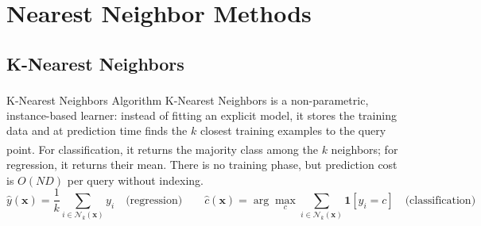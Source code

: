 \section{Nearest Neighbor Methods}

\subsection{K-Nearest Neighbors}

\begin{v3topic}{K-Nearest Neighbors Algorithm}
    K-Nearest Neighbors\textsuperscript{\cite{coverNearestNeighborPattern1967}} is a non-parametric, instance-based learner: instead of fitting an explicit model, it stores the training data and at prediction time finds the $k$ closest training examples to the query point\textsuperscript{\cite[][pp.~396--400]{hanDataMiningConcepts2012}}. For classification, it returns the majority class among the $k$ neighbors; for regression, it returns their mean. There is no training phase, but prediction cost is $O(ND)$ per query without indexing.
\visualseparator
    \begin{equation}
        \hat{y}(\mathbf{x}) = \frac{1}{k}\sum_{i \in \mathcal{N}_k(\mathbf{x})} y_i
        \quad \text{(regression)}
        \qquad
        \hat{c}(\mathbf{x}) = \arg\max_{c} \sum_{i \in \mathcal{N}_k(\mathbf{x})} \mathbf{1}[y_i = c]
        \quad \text{(classification)}
    \end{equation}

\end{v3topic}
